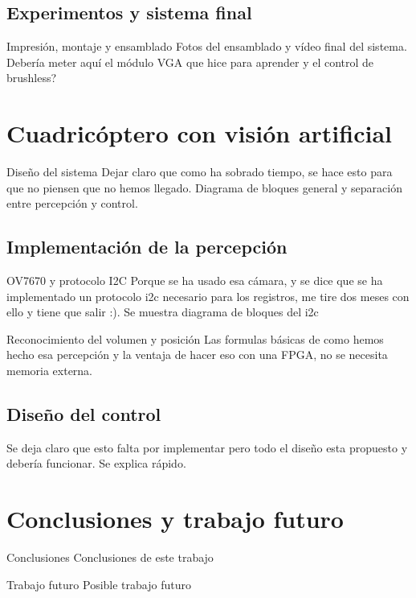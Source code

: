 \documentclass{beamer}
\begin{document}
\subsection{Experimentos y sistema final}
\begin{frame}{Impresión, montaje y ensamblado}
Fotos del ensamblado y vídeo final del sistema.
Debería meter aquí el módulo VGA que hice para aprender y el control de brushless?	
\end{frame}
\section{Cuadricóptero con visión artificial}
\begin{frame}{Diseño del sistema}
Dejar claro que como ha sobrado tiempo, se hace esto para que no piensen que no hemos llegado. Diagrama de bloques general y separación entre percepción y control.
\end{frame}
\subsection{Implementación de la percepción}
\begin{frame}{OV7670 y protocolo I2C}
Porque se ha usado esa cámara, y se dice que se ha implementado un protocolo i2c necesario para los registros, me tire dos meses con ello y tiene que salir :). Se muestra diagrama de bloques del i2c
\end{frame}
\begin{frame}{Reconocimiento del volumen y posición}
Las formulas básicas de como hemos hecho esa percepción y la ventaja de hacer eso con una FPGA, no se necesita memoria externa. 
\end{frame}
\subsection{Diseño del control}
\begin{frame}
Se deja claro que esto falta por implementar pero todo el diseño esta propuesto y debería funcionar. Se explica rápido.
\end{frame}
\section{Conclusiones y trabajo futuro}
\begin{frame}{Conclusiones}
Conclusiones de este trabajo
\end{frame}
\begin{frame}{Trabajo futuro}
Posible trabajo futuro
\end{frame}
\end{document}
